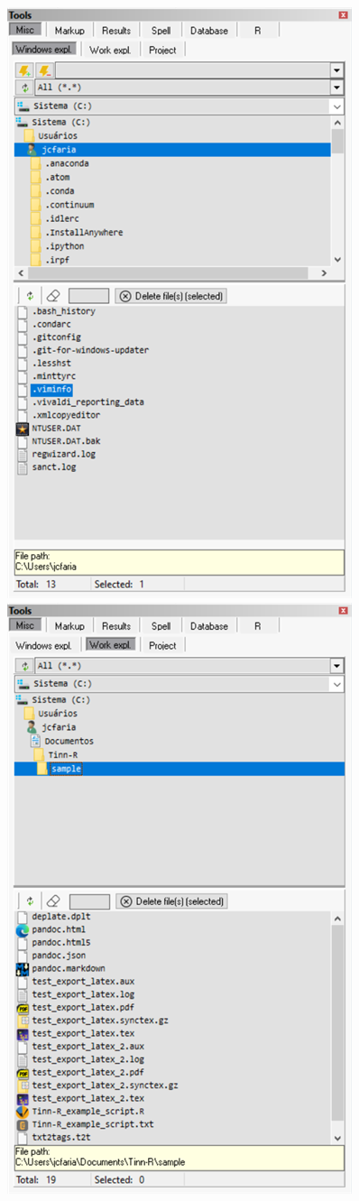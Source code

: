 \begin{figure}[H]
  \includegraphics[scale=0.35]{./res/tools_misc_windowsexpl.png}~~
  \includegraphics[scale=0.35]{./res/tools_misc_workexpl.png}~~

\end{figure}
